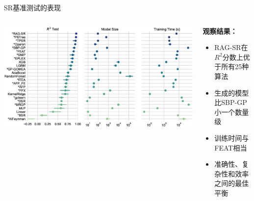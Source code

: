 \documentclass[aspectratio=1610]{beamer}
\begin{document}
    \begin{frame}{SR基准测试的表现}
        \begin{columns}
            \begin{column}{0.6\textwidth}
                \begin{center}
                    \includegraphics[width=\textwidth]{figs/pairgrid-pointplot_r2_test_model_size_training-time-(s).eps}
                \end{center}
            \end{column}

            \begin{column}{0.38\textwidth}
                \textbf{观察结果：}
                \begin{itemize}
                    \item RAG-SR在$R^2$分数上优于所有25种算法
                    \item 生成的模型比SBP-GP小一个数量级
                    \item 训练时间与FEAT相当
                    \item 准确性、复杂性和效率之间的最佳平衡
                \end{itemize}
            \end{column}
        \end{columns}
    \end{frame}
\end{document}
